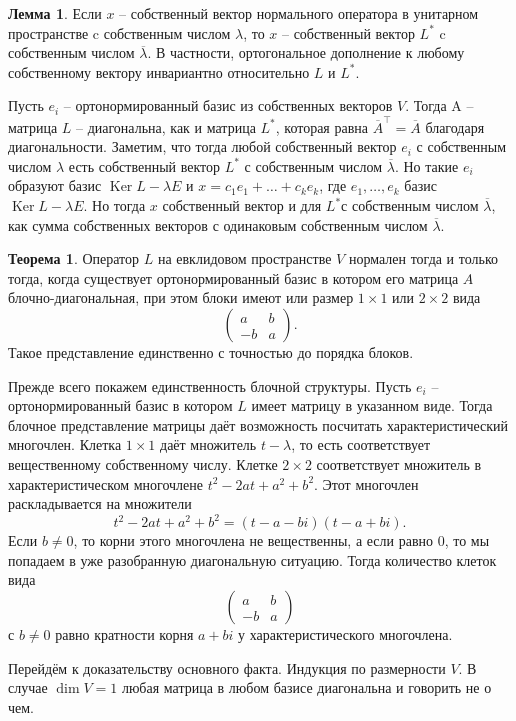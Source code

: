 \documentclass[10pt,a4paper,oneside]{book} %
\theoremstyle{definition}
\newtheorem{thm}{Теорема}
\newtheorem{lem}{Лемма}
\newcommand{\ovl}{\overline}
\DeclareMathOperator{\Ker}{Ker}
\def\thrm{\begin{thm}}
\def\ethrm{\end{thm}}
\def\lm{\begin{lem}}
\def\elm{\end{lem}}
\begin{document}
\lm Если $x$ -- собственный вектор нормального оператора в унитарном пространстве c собственным числом $\lambda$, то $x$ -- собственный вектор $L^*$ c собственным числом $\ovl{\lambda}$. В частности, ортогональное дополнение к любому собственному вектору инвариантно относительно $L$ и $L^*$.
\elm
\proof Пусть $e_i$ -- ортонормированный базис из собственных векторов $V$. Тогда A -- матрица $L$ -- диагональна, как и матрица $L^*$, которая равна $\ovl{A}^{\top}= \ovl{A}$ благодаря диагональности. Заметим, что тогда любой собственный вектор $e_i$ с собственным числом $\lambda$ есть собственный вектор $L^*$ с собственным числом $\ovl{\lambda}$.
Но такие $e_i$ образуют базис $\Ker L- \lambda E$ и
$x=c_1 e_1+\dots +c_k e_k$, где $e_1,\dots, e_k$ базис $\Ker L- \lambda E$. Но тогда $x$ собственный вектор и для $L^*$с собственным числом $\ovl{\lambda}$, как сумма собственных векторов с одинаковым собственным числом $\ovl{\lambda}$.
\endproof


\thrm
Оператор $L$ на евклидовом пространстве $V$ нормален  тогда и только тогда, когда существует ортонормированный базис в котором его матрица $A$ блочно-диагональная, при этом блоки имеют  или размер $1\times 1$ или $2\times 2$ вида
$$\begin{pmatrix}
a  & b\\
-b & a
\end{pmatrix}.$$
Такое представление единственно с точностью до порядка блоков.
\ethrm
\proof
Прежде всего покажем единственность блочной структуры. Пусть $e_i$ -- ортонормированный базис в котором $L$ имеет матрицу в указанном виде. Тогда блочное представление матрицы даёт возможность посчитать характеристический многочлен. Клетка $1\times 1$ даёт множитель $t-\lambda$, то есть соответствует вещественному собственному числу. Клетке $2\times 2$ соответствует множитель в характеристическом многочлене $t^2-2at+a^2+b^2$. Этот многочлен раскладывается на множители $$t^2-2at+a^2+b^2= (t-a-bi)(t-a+bi).$$
Если $b\neq 0$, то корни этого многочлена не вещественны, а если равно 0, то мы попадаем в уже разобранную диагональную ситуацию. Тогда количество клеток вида 
$$\begin{pmatrix}
a  & b\\
-b & a
\end{pmatrix}$$
с $b\neq 0$ равно кратности корня $a+bi$ у характеристического многочлена.



Перейдём к доказательству основного факта. Индукция по размерности $V$. В случае $\dim V=1$ любая матрица в любом базисе диагональна и говорить не о чем. 
\end{document}
